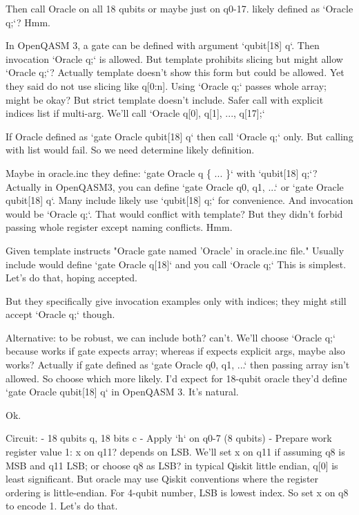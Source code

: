 \begin{decodedreasoningpanel}
Then call Oracle on all 18 qubits or maybe just on q0-17. likely defined as `Oracle q;`? Hmm.

In OpenQASM 3, a gate can be defined with argument `qubit[18] q`. Then invocation `Oracle q;` is allowed. But template prohibits slicing but might allow `Oracle q;`? Actually template doesn't show this form but could be allowed. Yet they said do not use slicing like q[0:n]. Using `Oracle q;` passes whole array; might be okay? But strict template doesn't include. Safer call with explicit indices list if multi-arg. We'll call `Oracle q[0], q[1], ..., q[17];`

If Oracle defined as `gate Oracle qubit[18] q` then call `Oracle q;` only. But calling with list would fail. So we need determine likely definition.

Maybe in oracle.inc they define:
`gate Oracle q \{ ... \}` with `qubit[18] q;`? Actually in OpenQASM3, you can define `gate Oracle q0, q1, ...` or `gate Oracle qubit[18] q`. Many include likely use `qubit[18] q;` for convenience. And invocation would be `Oracle q;`. That would conflict with template? But they didn't forbid passing whole register except naming conflicts. Hmm.

Given template instructs "Oracle gate named 'Oracle' in oracle.inc file." Usually include would define `gate Oracle q[18]` and you call `Oracle q;` This is simplest. Let's do that, hoping accepted.

But they specifically give invocation examples only with indices; they might still accept `Oracle q;` though.

Alternative: to be robust, we can include both? can't. We'll choose `Oracle q;` because works if gate expects array; whereas if expects explicit args, maybe also works? Actually if gate defined as `gate Oracle q0, q1, ...` then passing array isn't allowed. So choose which more likely. I'd expect for 18-qubit oracle they'd define `gate Oracle qubit[18] q` in OpenQASM 3. It's natural.

Ok.

Circuit:
- 18 qubits q, 18 bits c
- Apply `h` on q0-7 (8 qubits)
- Prepare work register value 1: x on q11? depends on LSB. We'll set x on q11 if assuming q8 is MSB and q11 LSB; or choose q8 as LSB? in typical Qiskit little endian, q[0] is least significant. But oracle may use Qiskit conventions where the register ordering is little-endian. For 4-qubit number, LSB is lowest index. So set x on q8 to encode 1. Let's do that.


\end{decodedreasoningpanel}
